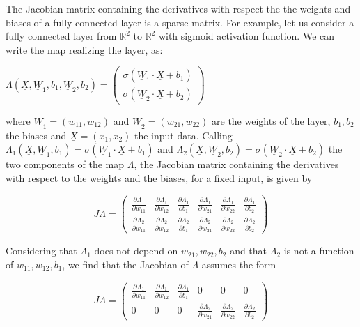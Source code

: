 The Jacobian matrix containing the derivatives with respect the the weights and biases of a fully connected layer is a sparse matrix. For example, let us consider a fully connected layer from $ \mathbb{R}^{2}$ to $ \mathbb{R}^{2} $ with sigmoid activation function. We can write the map realizing the layer, as\+:

$ \Lambda(\underline{X},\underline{W}_1,b_1,\underline{W}_2,b_2) = \begin{pmatrix} \sigma (\underline{W}_1 \cdot \underline{X} + b_1) \\ \sigma (\underline{W}_2 \cdot \underline{X} + b_2) \end{pmatrix} $

where $\underline{W}_1 = (w_{11},w_{12})$ and $\underline{W}_2 = (w_{21},w_{22})$ are the weights of the layer, $b_1,b_2$ the biases and $\underline{X} = (x_1,x_2)$ the input data. Calling $\Lambda_1(\underline{X},\underline{W}_1,b_1) = \sigma (\underline{W}_1 \cdot \underline{X} + b_1)$ and $\Lambda_2(\underline{X},\underline{W}_2,b_2) = \sigma (\underline{W}_2 \cdot \underline{X} + b_2)$ the two components of the map $ \Lambda$, the Jacobian matrix containing the derivatives with respect to the weights and the biases, for a fixed input, is given by

\[ J \Lambda = \begin{pmatrix} \frac{\partial \Lambda_1}{\partial w_{11}} & \frac{\partial \Lambda_1}{\partial w_{12}} & \frac{\partial \Lambda_1}{\partial b_1} & \frac{\partial \Lambda_1}{\partial w_{21}} & \frac{\partial \Lambda_1}{\partial w_{22}} & \frac{\partial \Lambda_1}{\partial b_2}\\ \frac{\partial \Lambda_2}{\partial w_{11}} & \frac{\partial \Lambda_2}{\partial w_{12}} & \frac{\partial \Lambda_2}{\partial b_1} & \frac{\partial \Lambda_2}{\partial w_{21}} & \frac{\partial \Lambda_2}{\partial w_{22}} & \frac{\partial \Lambda_2}{\partial b_2} \end{pmatrix} \]

Considering that $\Lambda_1$ does not depend on $w_{21},w_{22},b_2$ and that $\Lambda_2$ is not a function of $w_{11},w_{12},b_1$, we find that the Jacobian of $ \Lambda $ assumes the form

\[ J \Lambda = \begin{pmatrix} \frac{\partial \Lambda_1}{\partial w_{11}} & \frac{\partial \Lambda_1}{\partial w_{12}} & \frac{\partial \Lambda_1}{\partial b_1} & 0 & 0 & 0\\ 0 & 0 & 0 & \frac{\partial \Lambda_2}{\partial w_{21}} & \frac{\partial \Lambda_2}{\partial w_{22}} & \frac{\partial \Lambda_2}{\partial b_2} \end{pmatrix} \]

